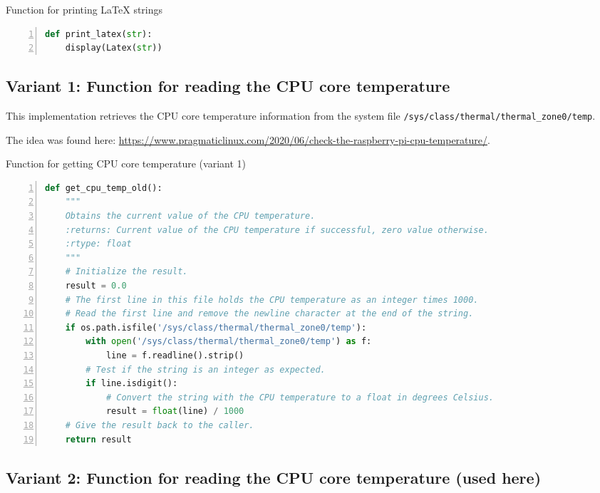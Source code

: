 \documentclass[10pt,parskip=half,
toc=sectionentrywithdots,
bibliography=totocnumbered,
captions=tableheading,numbers=noendperiod]{scrartcl}
\begin{document}
\begin{codecell}[H]
\caption{Function for printing LaTeX strings}
\label{code:f_print_latex}
\begin{lstlisting}[language=Python,numbers=left,xleftmargin=20pt,xrightmargin=5pt,belowskip=5pt,aboveskip=5pt]
def print_latex(str):
    display(Latex(str))
\end{lstlisting}\end{codecell}

\hypertarget{variant-1-function-for-reading-the-cpu-core-temperature}{%
\subsection{Variant 1: Function for reading the CPU core
temperature}\label{variant-1-function-for-reading-the-cpu-core-temperature}}

This implementation retrieves the CPU core temperature information from
the system file \texttt{/sys/class/thermal/thermal\_zone0/temp}.

The idea was found here:
\url{https://www.pragmaticlinux.com/2020/06/check-the-raspberry-pi-cpu-temperature/}.

\begin{codecell}[H]
\caption{Function for getting CPU core temperature (variant 1)}
\label{code:f_get_cpu_temp_1}
\begin{lstlisting}[language=Python,numbers=left,xleftmargin=20pt,xrightmargin=5pt,belowskip=5pt,aboveskip=5pt]
def get_cpu_temp_old():
    """
    Obtains the current value of the CPU temperature.
    :returns: Current value of the CPU temperature if successful, zero value otherwise.
    :rtype: float
    """
    # Initialize the result.
    result = 0.0
    # The first line in this file holds the CPU temperature as an integer times 1000.
    # Read the first line and remove the newline character at the end of the string.
    if os.path.isfile('/sys/class/thermal/thermal_zone0/temp'):
        with open('/sys/class/thermal/thermal_zone0/temp') as f:
            line = f.readline().strip()
        # Test if the string is an integer as expected.
        if line.isdigit():
            # Convert the string with the CPU temperature to a float in degrees Celsius.
            result = float(line) / 1000
    # Give the result back to the caller.
    return result
\end{lstlisting}\end{codecell}

\hypertarget{variant-2-function-for-reading-the-cpu-core-temperature-used-here}{%
\subsection{Variant 2: Function for reading the CPU core temperature
(used
here)}\label{variant-2-function-for-reading-the-cpu-core-temperature-used-here}}
\end{document}
